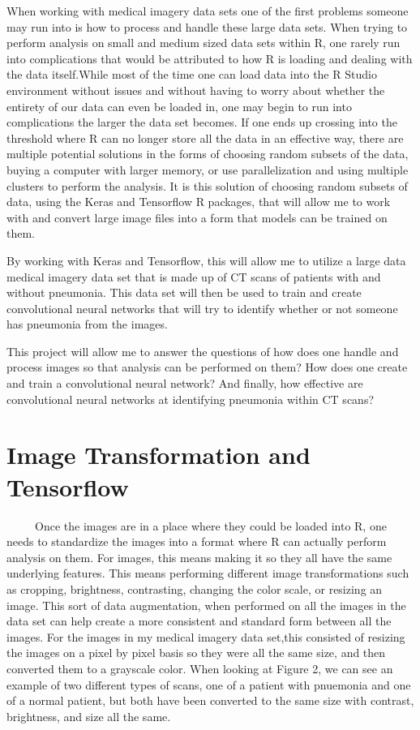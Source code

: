 \documentclass[12pt]{article}
\begin{document}
When working with medical imagery data sets one of the first problems
someone may run into is how to process and handle these large data sets.
When trying to perform analysis on small and medium sized data sets
within R, one rarely run into complications that would be attributed to
how R is loading and dealing with the data itself.While most of the time
one can load data into the R Studio environment without issues and
without having to worry about whether the entirety of our data can even
be loaded in, one may begin to run into complications the larger the
data set becomes. If one ends up crossing into the threshold where R can
no longer store all the data in an effective way, there are multiple
potential solutions in the forms of choosing random subsets of the data,
buying a computer with larger memory, or use parallelization and using
multiple clusters to perform the analysis. It is this solution of
choosing random subsets of data, using the Keras and Tensorflow R
packages, that will allow me to work with and convert large image files
into a form that models can be trained on them.

By working with Keras and Tensorflow, this will allow me to utilize a
large data medical imagery data set that is made up of CT scans of
patients with and without pneumonia. This data set will then be used to
train and create convolutional neural networks that will try to identify
whether or not someone has pneumonia from the images.

This project will allow me to answer the questions of how does one
handle and process images so that analysis can be performed on them? How
does one create and train a convolutional neural network? And finally,
how effective are convolutional neural networks at identifying pneumonia
within CT scans?

\hypertarget{image-transformation-and-tensorflow}{%
\section{Image Transformation and
Tensorflow}\label{image-transformation-and-tensorflow}}

~~~~~Once the images are in a place where they could be loaded into R,
one needs to standardize the images into a format where R can actually
perform analysis on them. For images, this means making it so they all
have the same underlying features. This means performing different image
transformations such as cropping, brightness, contrasting, changing the
color scale, or resizing an image. This sort of data augmentation, when
performed on all the images in the data set can help create a more
consistent and standard form between all the images. For the images in
my medical imagery data set,this consisted of resizing the images on a
pixel by pixel basis so they were all the same size, and then converted
them to a grayscale color. When looking at Figure 2, we can see an
example of two different types of scans, one of a patient with pnuemonia
and one of a normal patient, but both have been converted to the same
size with contrast, brightness, and size all the same.
\end{document}
